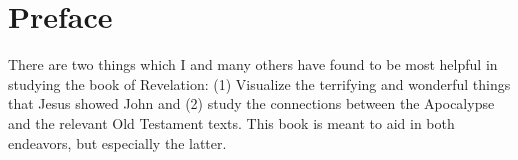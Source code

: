 \ClearShipoutPicture
{}

\blankpage
\clearpage
\clearpage

\tableofcontents
\clearpage
\listoffigures
\clearpage

\chapter{Preface}
There are two things which I and many others have found to be most helpful in studying the book of Revelation: (1) Visualize the terrifying and wonderful things that Jesus showed John and (2) study the connections between the Apocalypse and the relevant Old Testament texts. This book is meant to aid in both endeavors, but especially the latter. \\

